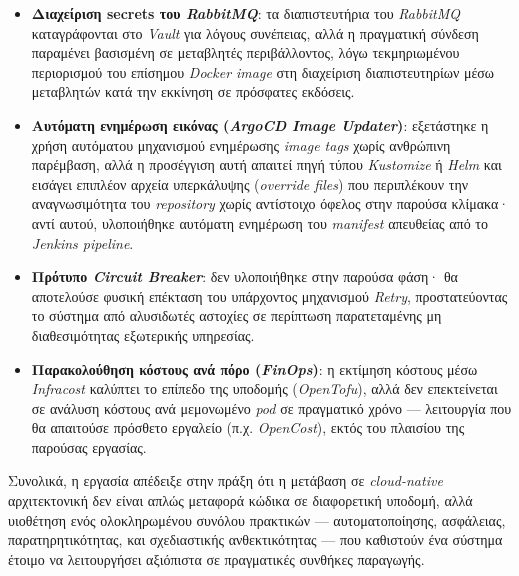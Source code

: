 \begin{itemize}
  \item \textbf{Διαχείριση secrets του \textit{RabbitMQ}}: τα διαπιστευτήρια του \textit{RabbitMQ} καταγράφονται στο \textit{Vault} για λόγους συνέπειας, αλλά η πραγματική σύνδεση παραμένει βασισμένη σε μεταβλητές περιβάλλοντος, λόγω τεκμηριωμένου περιορισμού του επίσημου \textit{Docker image} στη διαχείριση διαπιστευτηρίων μέσω μεταβλητών κατά την εκκίνηση σε πρόσφατες εκδόσεις.
  \item \textbf{Αυτόματη ενημέρωση εικόνας (\textit{ArgoCD Image Updater})}: εξετάστηκε η χρήση αυτόματου μηχανισμού ενημέρωσης \textit{image tags} χωρίς ανθρώπινη παρέμβαση, αλλά η προσέγγιση αυτή απαιτεί πηγή τύπου \textit{Kustomize} ή \textit{Helm} και εισάγει επιπλέον αρχεία υπερκάλυψης (\textit{override files}) που περιπλέκουν την αναγνωσιμότητα του \textit{repository} χωρίς αντίστοιχο όφελος στην παρούσα κλίμακα· αντί αυτού, υλοποιήθηκε αυτόματη ενημέρωση του \textit{manifest} απευθείας από το \textit{Jenkins pipeline}.
  \item \textbf{Πρότυπο \textit{Circuit Breaker}}: δεν υλοποιήθηκε στην παρούσα φάση· θα αποτελούσε φυσική επέκταση του υπάρχοντος μηχανισμού \textit{Retry}, προστατεύοντας το σύστημα από αλυσιδωτές αστοχίες σε περίπτωση παρατεταμένης μη διαθεσιμότητας εξωτερικής υπηρεσίας.
  \item \textbf{Παρακολούθηση κόστους ανά πόρο (\textit{FinOps})}: η εκτίμηση κόστους μέσω \textit{Infracost} καλύπτει το επίπεδο της υποδομής (\textit{OpenTofu}), αλλά δεν επεκτείνεται σε ανάλυση κόστους ανά μεμονωμένο \textit{pod} σε πραγματικό χρόνο --- λειτουργία που θα απαιτούσε πρόσθετο εργαλείο (π.χ. \textit{OpenCost}), εκτός του πλαισίου της παρούσας εργασίας.
\end{itemize}

Συνολικά, η εργασία απέδειξε στην πράξη ότι η μετάβαση σε \textit{cloud-native} αρχιτεκτονική δεν είναι απλώς μεταφορά κώδικα σε διαφορετική υποδομή, αλλά υιοθέτηση ενός ολοκληρωμένου συνόλου πρακτικών --- αυτοματοποίησης, ασφάλειας, παρατηρητικότητας, και σχεδιαστικής ανθεκτικότητας --- που καθιστούν ένα σύστημα έτοιμο να λειτουργήσει αξιόπιστα σε πραγματικές συνθήκες παραγωγής.